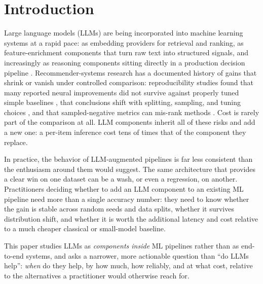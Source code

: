 \section{Introduction}
\label{sec:introduction}

Large language models (LLMs) are being incorporated into machine learning
systems at a rapid pace: as embedding providers for retrieval and ranking,
as feature-enrichment components that turn raw text into structured
signals, and increasingly as reasoning components sitting directly in a
production decision pipeline \cite{llm4rec-survey}. Recommender-systems
research has a documented history of gains that shrink or vanish under
controlled comparison: reproducibility studies found that many reported
neural improvements did not survive against properly tuned simple
baselines \cite{dacrema-progress, rendle-ncf-mf}, that conclusions shift
with splitting, sampling, and tuning choices \cite{sun-rigorous}, and that
sampled-negative metrics can mis-rank methods \cite{krichene-sampled}.
Cost is rarely part of the comparison at all. LLM components inherit
all of these risks and add a new one: a per-item inference cost tens of
times that of the component they replace.

In practice, the behavior of LLM-augmented pipelines is far less
consistent than the enthusiasm around them would suggest. The same
architecture that provides a clear win on one dataset can be a wash, or
even a regression, on another. Practitioners deciding whether to add an
LLM component to an existing ML pipeline need more than a single
accuracy number: they need to know whether the gain is stable across
random seeds and data splits, whether it survives distribution shift, and
whether it is worth the additional latency and cost relative to a much
cheaper classical or small-model baseline.

This paper studies LLMs as \emph{components inside} ML pipelines rather
than as end-to-end systems, and asks a narrower, more actionable question
than ``do LLMs help'': \emph{when} do they help, by how much, how
reliably, and at what cost, relative to the alternatives a practitioner
would otherwise reach for.

